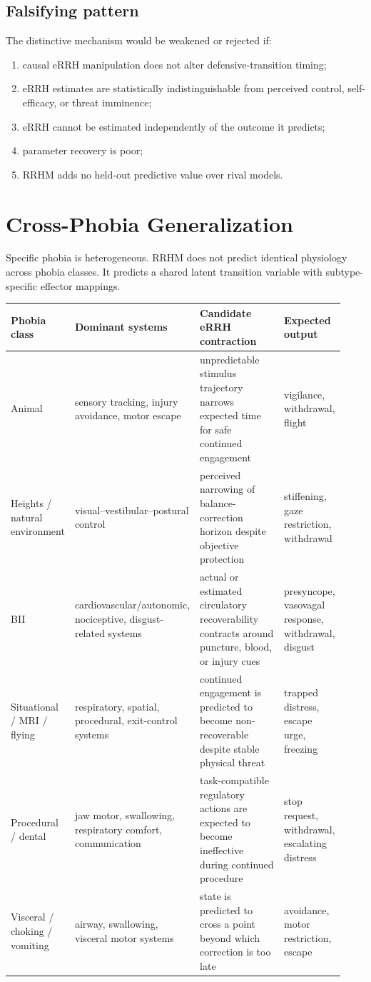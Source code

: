 \documentclass[9pt,twocolumn]{article}
\begin{document}
\subsection{Falsifying pattern}
The distinctive mechanism would be weakened or rejected if:
\begin{enumerate}[leftmargin=2em]
\item causal eRRH manipulation does not alter defensive-transition timing;
\item eRRH estimates are statistically indistinguishable from perceived control, self-efficacy, or threat imminence;
\item eRRH cannot be estimated independently of the outcome it predicts;
\item parameter recovery is poor;
\item RRHM adds no held-out predictive value over rival models.
\end{enumerate}

\section{Cross-Phobia Generalization}
Specific phobia is heterogeneous. RRHM does not predict identical physiology across phobia classes. It predicts a shared latent transition variable with subtype-specific effector mappings.

\onecolumn\begin{longtable}{p{0.17\linewidth}p{0.25\linewidth}p{0.34\linewidth}p{0.17\linewidth}}
\toprule
Phobia class & Dominant systems & Candidate eRRH contraction & Expected output \\
\midrule
Animal & sensory tracking, injury avoidance, motor escape & unpredictable stimulus trajectory narrows expected time for safe continued engagement & vigilance, withdrawal, flight \\
Heights / natural environment & visual--vestibular--postural control & perceived narrowing of balance-correction horizon despite objective protection & stiffening, gaze restriction, withdrawal \\
BII & cardiovascular/autonomic, nociceptive, disgust-related systems & actual or estimated circulatory recoverability contracts around puncture, blood, or injury cues & presyncope, vasovagal response, withdrawal, disgust \\
Situational / MRI / flying & respiratory, spatial, procedural, exit-control systems & continued engagement is predicted to become non-recoverable despite stable physical threat & trapped distress, escape urge, freezing \\
Procedural / dental & jaw motor, swallowing, respiratory comfort, communication & task-compatible regulatory actions are expected to become ineffective during continued procedure & stop request, withdrawal, escalating distress \\
Visceral / choking / vomiting & airway, swallowing, visceral motor systems & state is predicted to cross a point beyond which correction is too late & avoidance, motor restriction, escape \\
\bottomrule
\end{longtable}\twocolumn
\end{document}

